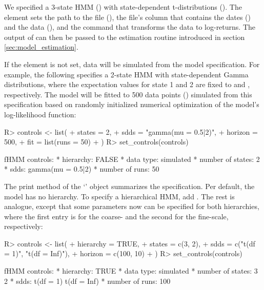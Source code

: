 \documentclass[article]{jss}
\newcommand{\class}[1]{`\code{#1}'}
\newcommand{\fct}[1]{\code{#1()}}
\begin{document}
We specified a 3-state HMM () with state-dependent t-distributions (). The  element sets the path to the file (), the file's column that contains the dates () and the data (), and the command  that transforms the data to log-returns. The output of \fct{set\_controls} can then be passed to the estimation routine introduced in section \ref{sec:model_estimation}.

If the  element is not set, data will be simulated from the model specification. For example, the following specifies a 2-state HMM with state-dependent Gamma distributions, where the expectation values for state 1 and 2 are fixed to  and , respectively. The model will be fitted to 500 data points () simulated from this specification based on  randomly initialized numerical optimization of the model's log-likelihood function:

%
\begin{Schunk}
\begin{Sinput}
R> controls <- list(
+    states  = 2,
+    sdds    = "gamma(mu = 0.5|2)",
+    horizon = 500,
+    fit     = list(runs = 50)
+  )
R> set_controls(controls)
\end{Sinput}
\begin{Soutput}
fHMM controls:
* hierarchy: FALSE 
* data type: simulated 
* number of states: 2 
* sdds: gamma(mu = 0.5|2) 
* number of runs: 50  
\end{Soutput}
\end{Schunk}
%

The print method of the \class{fHMM\_controls} object summarizes the specification. Per default, the model has no hierarchy. To specify a hierarchical HMM, add . The rest is analogue, except that some parameters now can be specified for both hierarchies, where the first entry is for the coarse- and the second for the fine-scale, respectively:

%
\begin{Schunk}
\begin{Sinput}
R> controls <- list(
+    hierarchy = TRUE,
+    states    = c(3, 2),
+    sdds      = c("t(df = 1)", "t(df = Inf)"),
+    horizon   = c(100, 10)
+  )
R> set_controls(controls)
\end{Sinput}
\begin{Soutput}
fHMM controls:
* hierarchy: TRUE 
* data type: simulated 
* number of states: 3 2 
* sdds: t(df = 1) t(df = Inf) 
* number of runs: 100  
\end{Soutput}
\end{Schunk}
%
\end{document}
